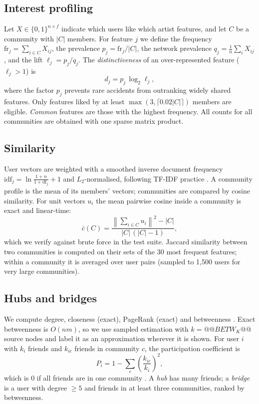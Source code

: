 \documentclass[conference]{IEEEtran}
\begin{document}
\subsection{Interest profiling}
Let $X\in\{0,1\}^{n\times f}$ indicate which users like which artist features, and let $C$ be a community with $|C|$ members. For feature $j$ we define the frequency $\mathrm{fr}_j=\sum_{i\in C}X_{ij}$, the prevalence $p_j=\mathrm{fr}_j/|C|$, the network prevalence $q_j=\frac{1}{n}\sum_i X_{ij}$, and the lift $\ell_j=p_j/q_j$. The \emph{distinctiveness} of an over-represented feature ($\ell_j>1$) is
\begin{equation}
d_j = p_j\,\log_2 \ell_j ,
\end{equation}
where the factor $p_j$ prevents rare accidents from outranking widely shared features. Only features liked by at least $\max(3,\lceil 0.02|C|\rceil)$ members are eligible. \emph{Common} features are those with the highest frequency. All counts for all communities are obtained with one sparse matrix product.

\subsection{Similarity}
User vectors are weighted with a smoothed inverse document frequency $\mathrm{idf}_j=\ln\frac{1+n}{1+\mathrm{df}_j}+1$ and $L_2$-normalised, following TF-IDF practice \cite{salton1988}. A community profile is the mean of its members' vectors; communities are compared by cosine similarity. For unit vectors $u_i$ the mean pairwise cosine inside a community is exact and linear-time:
\begin{equation}
\bar{c}(C)=\frac{\left\lVert\sum_{i\in C}u_i\right\rVert^2-|C|}{|C|\,(|C|-1)} ,
\end{equation}
which we verify against brute force in the test suite. Jaccard similarity \cite{jaccard1901} between two communities is computed on their sets of the 30 most frequent features; within a community it is averaged over user pairs (sampled to 1{,}500 users for very large communities).

\subsection{Hubs and bridges}
We compute degree, closeness (exact), PageRank \cite{page1999} (exact) and betweenness \cite{freeman1977}. Exact betweenness is $O(nm)$, so we use sampled estimation \cite{brandes2007} with $k=@@BETW_K@@$ source nodes and label it as an approximation wherever it is shown. For user $i$ with $k_i$ friends and $k_{ic}$ friends in community $c$, the participation coefficient is
\begin{equation}
P_i = 1-\sum_c \left(\frac{k_{ic}}{k_i}\right)^2 ,
\end{equation}
which is $0$ if all friends are in one community \cite{guimera2005}. A \emph{hub} has many friends; a \emph{bridge} is a user with degree $\ge 5$ and friends in at least three communities, ranked by betweenness.
\end{document}
